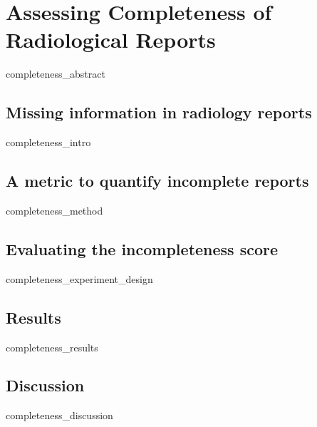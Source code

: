 \chapter{Assessing Completeness of Radiological Reports}
{completeness_abstract}
\clearpage

\section{Missing information in radiology reports}
{completeness_intro}
\clearpage

\section{A metric to quantify incomplete reports}
{completeness_method}
\clearpage

\section{Evaluating the incompleteness score}
{completeness_experiment_design}
\clearpage

\section{Results}
{completeness_results}
\clearpage

\section{Discussion}
{completeness_discussion}
\clearpage